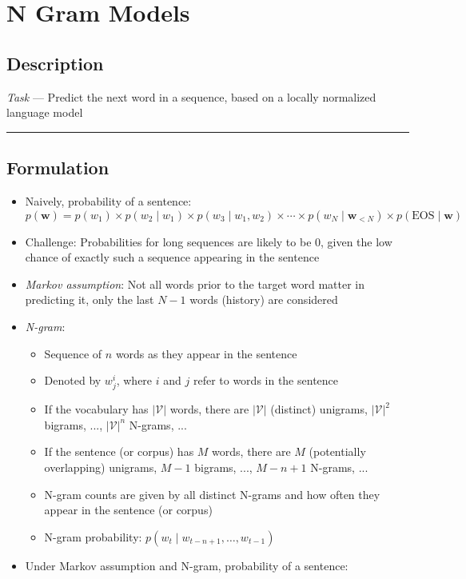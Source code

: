 \section{N Gram Models}
\subsection*{Description}
\emph{Task} --- Predict the next word in a sequence, based on a locally normalized language model

{\color{black}\hrule height 0.001mm}

\subsection*{Formulation}
\begin{itemize}
    \item Naively, probability of a sentence: $
    p(\boldsymbol{w}) = p(w_1) \times p(w_2 \mid w_1) \times p(w_3 \mid w_1, w_2) \times \cdots \times p(w_N \mid \boldsymbol{w}_{<N}) \times p(\textrm{EOS} \mid \boldsymbol{w})
    $
    \item Challenge: Probabilities for long sequences are likely to be $0$, given the low chance of exactly such a sequence appearing in the sentence
    \item \emph{Markov assumption}: Not all words prior to the target word matter in predicting it, only the last $N-1$ words (history) are considered
    \item \emph{N-gram}:
    \begin{itemize}
        \item Sequence of $n$ words as they appear in the sentence
        \item Denoted by $w^i_j$, where $i$ and $j$ refer to words in the sentence
        \item If the vocabulary has $|\mathcal{V}|$ words, there are $|\mathcal{V}|$ (distinct) unigrams, $|\mathcal{V}|^2$ bigrams, ..., $|\mathcal{V}|^n$ N-grams, ...
        \item If the sentence (or corpus) has $M$ words, there are $M$ (potentially overlapping) unigrams, $M-1$ bigrams, ..., $M-n+1$ N-grams, ...
        \item N-gram counts are given by all distinct N-grams and how often they appear in the sentence (or corpus)
        \item N-gram probability:
        $
        p(w_t \mid w_{t-n+1}, \ldots, w_{t-1})
        $
    \end{itemize}
    \item Under Markov assumption and N-gram, probability of a sentence: 

\end{itemize}
